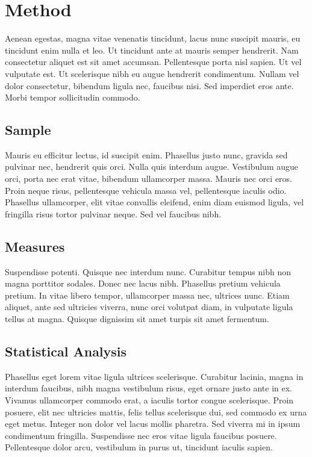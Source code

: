 \section{Method}
\label{sec:3}

Aenean egestas, magna vitae venenatis tincidunt, lacus nunc suscipit mauris, eu tincidunt enim nulla et leo. Ut tincidunt ante at mauris semper hendrerit. Nam consectetur aliquet est sit amet accumsan. Pellentesque porta nisl sapien. Ut vel vulputate est. Ut scelerisque nibh eu augue hendrerit condimentum. Nullam vel dolor consectetur, bibendum ligula nec, faucibus nisi. Sed imperdiet eros ante. Morbi tempor sollicitudin commodo.

\subsection{Sample}

Mauris eu efficitur lectus, id suscipit enim. Phasellus justo nunc, gravida sed pulvinar nec, hendrerit quis orci. Nulla quis interdum augue. Vestibulum augue orci, porta nec erat vitae, bibendum ullamcorper massa. Mauris nec orci eros. Proin neque risus, pellentesque vehicula massa vel, pellentesque iaculis odio. Phasellus ullamcorper, elit vitae convallis eleifend, enim diam euismod ligula, vel fringilla risus tortor pulvinar neque. Sed vel faucibus nibh.

\subsection{Measures}

Suspendisse potenti. Quisque nec interdum nunc. Curabitur tempus nibh non magna porttitor sodales. Donec nec lacus nibh. Phasellus pretium vehicula pretium. In vitae libero tempor, ullamcorper massa nec, ultrices nunc. Etiam aliquet, ante sed ultricies viverra, nunc orci volutpat diam, in vulputate ligula tellus at magna. Quisque dignissim sit amet turpis sit amet fermentum.

\subsection{Statistical Analysis}

Phasellus eget lorem vitae ligula ultrices scelerisque. Curabitur lacinia, magna in interdum faucibus, nibh magna vestibulum risus, eget ornare justo ante in ex. Vivamus ullamcorper commodo erat, a iaculis tortor congue scelerisque. Proin posuere, elit nec ultricies mattis, felis tellus scelerisque dui, sed commodo ex urna eget metus. Integer non dolor vel lacus mollis pharetra. Sed viverra mi in ipsum condimentum fringilla. Suspendisse nec eros vitae ligula faucibus posuere. Pellentesque dolor arcu, vestibulum in purus ut, tincidunt iaculis sapien.

